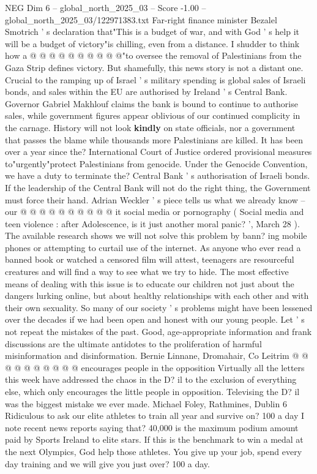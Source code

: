 \begin{textsample}{NEG Dim 6 – global\_north\_2025\_03 – Score -1.00 – global\_north\_2025\_03/122971383.txt}
Far-right finance minister Bezalel Smotrich ' s declaration that"This is a budget of war, and with God ' s help it will be a budget of victory"is chilling, even from a distance.
I shudder to think how a @ @ @ @ @ @ @ @ @ @"to oversee the removal of Palestinians from the Gaza Strip defines victory.
But shamefully, this news story is not a distant one.
Crucial to the ramping up of Israel ' s military spending is global sales of Israeli bonds, and sales within the EU are authorised by Ireland ' s Central Bank.
Governor Gabriel Makhlouf claims the bank is bound to continue to authorise sales, while government figures appear oblivious of our continued complicity in the carnage.
History will not look \textbf{kindly} on state officials, nor a government that passes the blame while thousands more Palestinians are killed.
It has been over a year since the?
International Court of Justice ordered provisional measures to"urgently"protect Palestinians from genocide.
Under the Genocide Convention, we have a duty to terminate the?
Central Bank ' s authorisation of Israeli bonds.
If the leadership of the Central Bank will not do the right thing, the Government must force their hand.
Adrian Weckler ' s piece tells us what we already know -- our @ @ @ @ @ @ @ @ @ @ it social media or pornography ( Social media and teen violence : after Adolescence, is it just another moral panic? ', March 28 ).
The available research shows we will not solve this problem by bann? ing mobile phones or attempting to curtail use of the internet.
As anyone who ever read a banned book or watched a censored film will attest, teenagers are resourceful creatures and will find a way to see what we try to hide.
The most effective means of dealing with this issue is to educate our children not just about the dangers lurking online, but about healthy relationships with each other and with their own sexuality.
So many of our society ' s problems might have been lessened over the decades if we had been open and honest with our young people.
Let ' s not repeat the mistakes of the past.
Good, age-appropriate information and frank discussions are the ultimate antidotes to the proliferation of harmful misinformation and disinformation.
Bernie Linnane, Dromahair, Co Leitrim @ @ @ @ @ @ @ @ @ @ encourages people in the opposition Virtually all the letters this week have addressed the chaos in the D? il to the exclusion of everything else, which only encourages the little people in opposition.
Televising the D? il was the biggest mistake we ever made.
Michael Foley, Rathmines, Dublin 6 Ridiculous to ask our elite athletes to train all year and survive on? 100 a day I note recent news reports saying that? 40,000 is the maximum podium amount paid by Sports Ireland to elite stars.
If this is the benchmark to win a medal at the next Olympics, God help those athletes.
You give up your job, spend every day training and we will give you just over? 100 a day.

\end{textsample}
